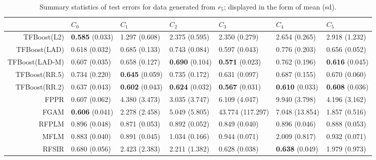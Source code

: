 \begin{table}[H]
\centering
\footnotesize
\begin{tabular}{rllllll}
  \hline
 & $C_0$ & $C_1$ & $C_2$ & $C_3$ & $C_4$ & $C_5$ \\ 
  \hline
TFBoost(L2) & \textbf{0.585} (0.033) & 1.297 (0.608) & 2.375 (0.595) & 2.350 (0.279) & 2.654 (0.265) & 2.918 (1.232) \\ 
  TFBoost(LAD) & 0.618 (0.032) & 0.685 (0.133) & 0.743 (0.084) & 0.597 (0.043) & 0.776 (0.203) & 0.656 (0.052) \\ 
  TFBoost(LAD-M) & 0.607 (0.035) & 0.658 (0.127) & \textbf{0.690} (0.104) & \textbf{0.571} (0.023) & 0.762 (0.196) & \textbf{0.616} (0.045) \\ 
  TFBoost(RR.5) & 0.734 (0.220) & \textbf{0.645} (0.059) & 0.735 (0.172) & 0.631 (0.097) & 0.687 (0.155) & 0.670 (0.060) \\ 
  TFBoost(RR.2) & 0.637 (0.043) & \textbf{0.602} (0.043) & \textbf{0.624} (0.032) & \textbf{0.567} (0.031) & \textbf{0.610} (0.033) & \textbf{0.608} (0.036) \\ 
  FPPR & 0.607 (0.062) & 4.380 (3.473) & 3.035 (3.747) & 6.109 (4.047) & 9.940 (3.798) & 4.196 (3.162) \\ 
  FGAM & \textbf{0.606} (0.041) & 2.278 (2.458) & 5.049 (5.805) & 43.774 (117.297) & 7.048 (13.854) & 1.857 (0.516) \\ 
  RFPLM & 0.896 (0.048) & 0.871 (0.053) & 0.892 (0.052) & 0.849 (0.040) & 0.896 (0.046) & 0.888 (0.053) \\ 
  MFLM & 0.883 (0.040) & 0.891 (0.045) & 1.034 (0.166) & 0.944 (0.071) & 2.009 (0.817) & 0.932 (0.071) \\ 
  RFSIR & 0.680 (0.056) & 2.423 (2.383) & 2.211 (1.382) & 0.628 (0.038) & \textbf{0.638} (0.049) & 1.979 (0.973) \\ 
   \hline
\end{tabular}
\caption{Summary statistics of test errors for data generated from $r_5$; displayed in the form of mean (sd).} 
\end{table}

